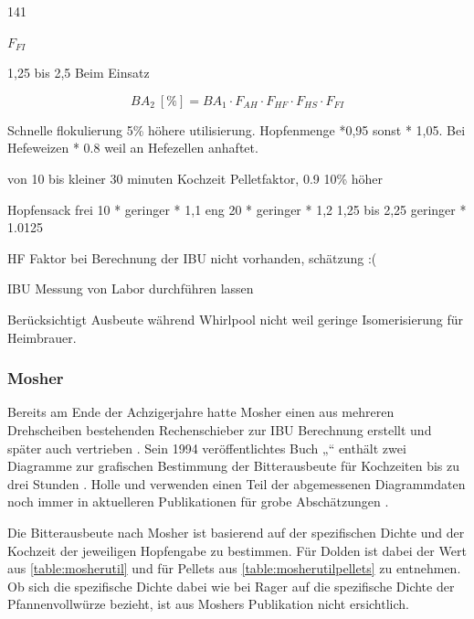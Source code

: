 \documentclass[a4paper,parskip=half]{scrartcl}
\newcommand{\BA}{\mathit{BA}}
\newcommand{\uper}{\:[\textrm{\%}]}
\newcommand{\FAH}{F_{\mathit{AH}}}
\newcommand{\FHF}{F_{\mathit{HF}}}
\newcommand{\FHS}{F_{\mathit{HS}}}
\newcommand{\FFil}{F_{\mathit{FI}}}
\begin{document}
141

$\FFil$

1,25 bis 2,5 Beim Einsatz


\begin{equation}
\BA_2 \uper = BA_1 \cdot \FAH \cdot \FHF \cdot \FHS \cdot \FFil
\label{eq:garetzba2}
\end{equation}





\parencite[140\psq]{Garetz1994} 
Schnelle flokulierung 5\% höhere utilisierung. Hopfenmenge *0,95
sonst * 1,05. Bei Hefeweizen * 0.8 weil an Hefezellen anhaftet.

von 10 bis kleiner 30 minuten Kochzeit Pelletfaktor, 0.9 10\% höher

Hopfensack
frei 10 * geringer * 1,1
eng 20 * geringer * 1,2
1,25 bis 2,25 geringer * 1.0125

HF Faktor bei Berechnung der IBU nicht vorhanden, schätzung :(

\parencite[134-144]{Garetz1994} 

IBU Messung von Labor durchführen lassen
\parencite[145]{Garetz1994} 

Berücksichtigt Ausbeute während Whirlpool nicht weil geringe
Isomerisierung für Heimbrauer.
\parencite[167]{Garetz1994} 

\subsubsection*{Mosher}

Bereits am Ende der Achzigerjahre hatte Mosher einen aus mehreren
Drehscheiben bestehenden Rechenschieber zur IBU Berechnung erstellt und später
auch vertrieben \parencite{Mosher2022}. Sein 1994 veröffentlichtes
Buch „“ enthält zwei Diagramme zur grafischen
Bestimmung der Bitterausbeute für Kochzeiten bis zu drei Stunden
\parencite[160\psq]{Mosher1994}. Holle und \citeauthor{Thesseling2019} verwenden
einen Teil der abgemessenen Diagrammdaten noch immer in aktuelleren
Publikationen für grobe Abschätzungen \parencites[51]{Holle2010}[9]{Thesseling2019}.

Die Bitterausbeute nach Mosher ist basierend auf der spezifischen Dichte und
der Kochzeit der jeweiligen Hopfengabe zu bestimmen. Für Dolden ist
dabei der Wert aus \autoref{table:mosherutil} und für Pellets aus
\autoref{table:mosherutilpellets} zu entnehmen. Ob sich die
spezifische Dichte dabei wie bei Rager auf die spezifische Dichte der Pfannenvollwürze
bezieht, ist aus Moshers Publikation nicht ersichtlich.
\end{document}
